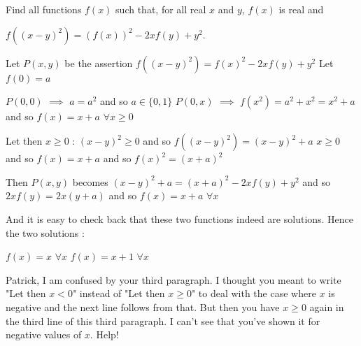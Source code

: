 \begin{solution}
	\begin{tcolorbox}Find all functions $ f(x)$ such that, for all real $ x$ and $ y$, $ f(x)$ is real and

$ f((x - y)^{2}) = (f(x))^{2} - 2xf(y) + y^{2}$.\end{tcolorbox}

Let $ P(x,y)$ be the assertion $ f((x-y)^2)=f(x)^2-2xf(y)+y^2$
Let $ f(0)=a$

$ P(0,0)$ $ \implies$ $ a=a^2$ and so $ a\in\{0,1\}$
$ P(0,x)$ $ \implies$ $ f(x^2)=a^2+x^2=x^2+a$ and so $ f(x)=x+a$ $ \forall x\ge 0$

Let then $ x\ge 0$ :
$ (x-y)^2\ge 0$ and so $ f((x-y)^2)=(x-y)^2+a$
$ x\ge 0$ and so $ f(x)=x+a$ and so $ f(x)^2=(x+a)^2$

Then $ P(x,y)$ becomes $ (x-y)^2+a=(x+a)^2-2xf(y)+y^2$ and so $ 2xf(y)=2x(y+a)$ and so $ f(x)=x+a$ $ \forall x$

And it is easy to check back that these two functions indeed are solutions. Hence the two solutions :

$ f(x)=x$ $ \forall x$
$ f(x)=x+1$ $ \forall x$
\end{solution}



\begin{solution}
	Patrick, I am confused by your third paragraph. I thought you meant to write "Let then $ x<0$" instead of "Let then $ x\ge0$" to deal with the case where $ x$ is negative and the next line follows from that. But then you have $ x\ge0$ again in the third line of this third paragraph. I can't see that you've shown it for negative values of $ x$. Help!
\end{solution}



